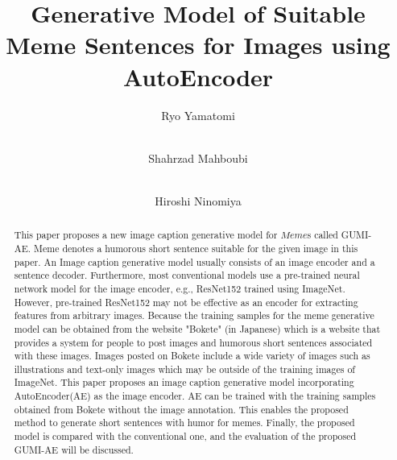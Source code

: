 \documentclass[runningheads]{llncs}
\begin{document}
\title{
    Generative Model of Suitable Meme Sentences for Images using AutoEncoder
}

\author{
    Ryo Yamatomi     \and \\
    Shahrzad Mahboubi    \and \\
    Hiroshi Ninomiya    
}



\maketitle

\begin{abstract}
This paper proposes a new image caption generative model for $ Meme $s called GUMI-AE. Meme denotes a humorous short sentence suitable for the given image in this paper. An Image caption generative model usually consists of an image encoder and a sentence decoder. Furthermore, most conventional models use a pre-trained neural network model for the image encoder, e.g., ResNet152 trained using ImageNet. However, pre-trained ResNet152 may not be effective as an encoder for extracting features from arbitrary images. Because the training samples for the meme generative model can be obtained from the website "Bokete" (in Japanese) which is a website that provides a system for people to post images and humorous short sentences associated with these images. Images posted on Bokete include a wide variety of images such as illustrations and text-only images which may be outside of the training images of ImageNet. This paper proposes an image caption generative model incorporating AutoEncoder(AE) as the image encoder. AE can be trained with the training samples obtained from Bokete without the image annotation. This enables the proposed method to generate short sentences with humor for memes. Finally, the proposed model is compared with the conventional one, and the evaluation of the proposed GUMI-AE will be discussed.

\end{abstract}
\end{document}
